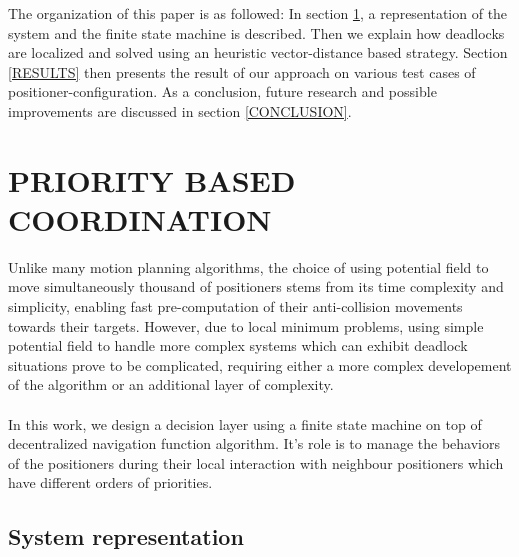 \documentclass[]{spie}  %
\begin{document}
	The organization of this paper is as followed: In section \ref{PRIORITY BASED COORDINATION}, a representation of the system and the finite state machine is described. Then we explain how deadlocks are localized and solved using an heuristic vector-distance based strategy. Section \ref{RESULTS} then presents the result of our approach on various test cases of positioner-configuration. As a conclusion, future research and possible improvements are discussed in section \ref{CONCLUSION}.
	
	\section{PRIORITY BASED COORDINATION}
	\label{PRIORITY BASED COORDINATION}
	
	
	Unlike many motion planning algorithms, the choice of using potential field to move simultaneously thousand of positioners stems from its time complexity and simplicity, enabling fast pre-computation of their anti-collision movements towards their targets. However, due to local minimum problems, using simple potential field to handle more complex systems which can exhibit deadlock situations prove to be complicated, requiring either a more complex developement of the algorithm or an additional layer of complexity.\\\\
	In this work, we design a decision layer using a finite state machine on top of decentralized navigation function algorithm. It's role is to manage the behaviors of the positioners during their local interaction with neighbour positioners which have different orders of priorities. 

	\subsection{System representation}	
		\label{Finite-state machine} 
	
\end{document}
